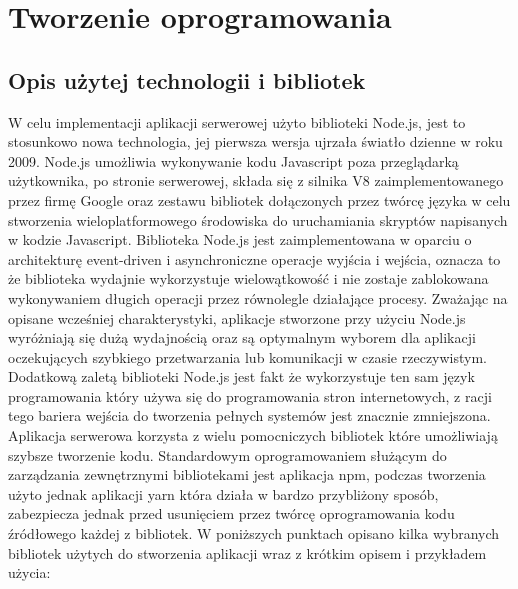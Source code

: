 \chapter{Tworzenie oprogramowania}
\label{cha:tworzenie_oprogramowania}

\section{Opis użytej technologii i bibliotek}

W celu implementacji aplikacji serwerowej użyto biblioteki Node.js, jest to stosunkowo nowa technologia, jej pierwsza wersja ujrzała światło dzienne w roku 2009. Node.js umożliwia wykonywanie kodu Javascript poza przeglądarką użytkownika, po stronie serwerowej, składa się z silnika V8 zaimplementowanego przez firmę Google oraz zestawu bibliotek dołączonych przez twórcę języka w celu stworzenia wieloplatformowego środowiska do uruchamiania skryptów napisanych w kodzie Javascript. Biblioteka Node.js jest zaimplementowana w oparciu o architekturę event-driven i asynchroniczne operacje wyjścia i wejścia, oznacza to że biblioteka wydajnie wykorzystuje wielowątkowość i nie zostaje zablokowana wykonywaniem długich operacji przez równolegle działające procesy. Zważając na opisane wcześniej charakterystyki, aplikacje stworzone przy użyciu Node.js wyróżniają się dużą wydajnością oraz są optymalnym wyborem dla aplikacji oczekujących szybkiego przetwarzania lub komunikacji w czasie rzeczywistym. Dodatkową zaletą biblioteki Node.js jest fakt że wykorzystuje ten sam język programowania który używa się do programowania stron internetowych, z racji tego bariera wejścia do tworzenia pełnych systemów jest znacznie zmniejszona.
Aplikacja serwerowa korzysta z wielu pomocniczych bibliotek które umożliwiają szybsze tworzenie kodu. Standardowym oprogramowaniem służącym do zarządzania zewnętrznymi bibliotekami jest aplikacja npm, podczas tworzenia użyto jednak aplikacji yarn która działa w bardzo przybliżony sposób, zabezpiecza jednak przed usunięciem przez twórcę oprogramowania kodu źródłowego każdej z bibliotek. W poniższych punktach opisano kilka wybranych bibliotek użytych do stworzenia aplikacji wraz z krótkim opisem i przykładem użycia:


